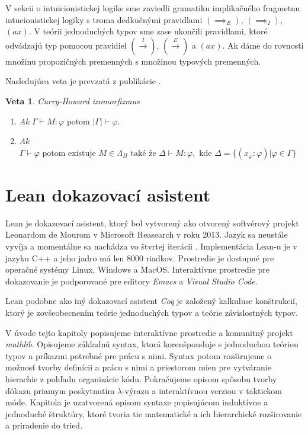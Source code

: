 \documentclass[a4paper,10pt,oneside]{report}%
\newtheorem{theorem}{Veta}[chapter]
\begin{document}
    V sekcii o intuicionistickej logike sme zaviedli gramatiku implikačného fragmetnu
intucionistickej logiky s troma dedkučnými pravidlami $(\implies_{E})$,
    $(\implies_{I})$, $(ax)$.
    V teórii jednoduchých typov sme zase ukončili pravidlami, ktoré odvádzajú
typ pomocou pravidiel $(\overset{I}{\rightarrow})$, $(\overset{E}{\rightarrow})$ a $(ax)$.
    Ak dáme do rovnosti množinu propozičných premenných s množinou typových premenných.

    Nasledujúca veta je prevzatá z publikácie \cite{SorensenUrzyczyn}.
\begin{theorem}{Curry-Howard izomorfizmus}
    \begin{enumerate}
        \item Ak $\Gamma \vdash M : \varphi \textrm{ potom } |\Gamma|  \vdash \varphi.$
        \item Ak $\Gamma \vdash \varphi \textrm{ potom existuje } M \in \Lambda_{\Pi}
            \textrm{ také že } \Delta \vdash M : \varphi, \textrm{ kde }
            \Delta = \{ ( x_{\varphi} : \varphi ) | \varphi \in \Gamma \}$
    \end{enumerate}
\end{theorem}

\chapter{Lean dokazovací asistent}
    Lean je dokazovací asistent, ktorý bol vytvorený ako otvorený softvérový projekt
Leonardom de Mourom v Microsoft Reasearch v roku 2013.
    Jazyk sa neustále vyvíja a momentálne sa nachádza vo štvrtej iterácii \cite{lean4}.
    Implementácia Lean-u je v jazyku C++ a jeho jadro má len 8000 riadkov.
    Prostredie je dostupné pre operačné systémy Linux, Windows a MacOS.
    Interaktívne prostredie pre dokazovanie je podporované pre editory \emph{Emacs} a \emph{Visual Studio Code}.

    Lean podobne ako iný dokazovací asistent \emph{Coq} je založený kalkuluse konštrukcií, ktorý je zovšeobecnením 
teórie jednoduchých typov a teórie závislostných typov.

    V úvode tejto kapitoly popisujeme interaktívne prostredie a komunitný projekt 
\emph{mathlib}.
    Opisujeme základnú syntax, ktorá korenšponduje s jednoduchou teóriou
typov a príkazmi potrebné pre prácu s nimi. Syntax potom rozširujeme o možnosť
tvorby definícii a prácu s nimi a priestorom mien pre vytváranie hierachie z pohľadu
organizácie kódu.
    Pokračujeme opisom spôsobu tvorby dôkazu priamym poskytnutím $\lambda$-výrazu
a interaktívnou verziou v taktickom móde.
    Kapitola je uzatvorená opisom syntaxe popisujúcom induktívne a jednoduché
štruktúry, ktoré tvoria tie matematické a ich hierarchické rozširovanie a priradenie
do tried.
\end{document}
